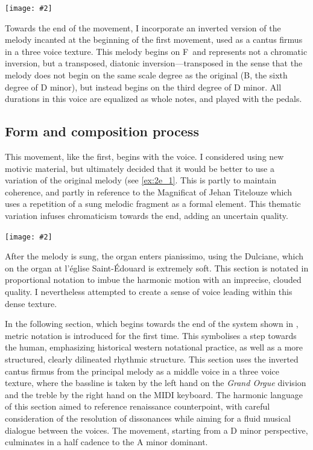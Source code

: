 \documentclass[12pt,twoside,maitrise]{dms_ks}
\newcommand{\customincludeexamples}[4][]{%
    \begin{example}[H]
        \centering
        \texttt{[image: \#2]}
        \caption{#4}
	\label{#3} 
    \end{example}
}
\theoremstyle{definition}
\begin{document}
{\customincludeexamples[]{g7alt}{fig:g7alt}{A classic G7alt chord on the left, and my variation with a \sh7 on the right.}

Towards the end of the movement, I incorporate an inverted version of the melody incanted at the beginning of the first movement, used as a cantus firmus in a three voice texture.
This melody begins on F\na\ and represents not a chromatic inversion, but a transposed, diatonic inversion---transposed in the sense that the melody does not begin on the same scale degree as the original (B\fl, the sixth degree of D minor), but instead begins on the third degree of D minor. 
All durations in this voice are equalized as whole notes, and played with the pedals.

\subsection{Form and composition process}

This movement, like the first, begins with the voice.
I considered using new motivic material, but ultimately decided that it would be better to use a variation of the original melody (see \cref{ex:2e_1}.
This is partly to maintain coherence, and partly in reference to the Magnificat of Jehan Titelouze which uses a repetition of a sung melodic fragment as a formal element.
This thematic variation infuses chromaticism towards the end, adding an uncertain quality.

\customincludeexamples[width=\textwidth]{2e_1}{ex:2e_1}{A variation of the sung melody from the first movement (p.~2, sys.~1).}

After the melody is sung, the organ enters pianissimo, using the Dulciane, which on the organ at l'église Saint-Édouard is extremely soft.
This section is notated in proportional notation to imbue the harmonic motion with an imprecise, clouded quality.
I nevertheless attempted to create a sense of voice leading within this dense texture.

In the following section, which begins towards the end of the system shown in , metric notation is introduced for the first time.
This symbolises a step towards the human, emphasizing historical western notational practice, as well as a more structured, clearly dilineated rhythmic structure. 
This section uses the inverted cantus firmus from the principal melody as a middle voice in a three voice texture, where the bassline is taken by the left hand on the \textit{Grand Orgue} division and the treble by the right hand on the MIDI keyboard.
The harmonic language of this section aimed to reference renaissance counterpoint, with careful consideration of the resolution of dissonances while aiming for a fluid musical dialogue between the voices.
The movement, starting from a D minor perspective, culminates in a half cadence to the A minor dominant.

}
\end{document}
